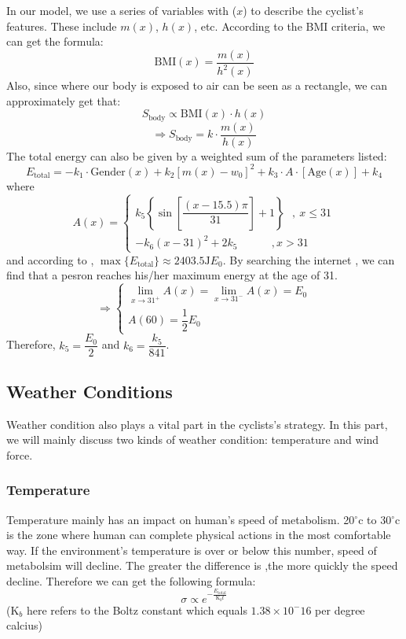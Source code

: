 \documentclass[12pt]{article}
\theoremstyle{definition}
\theoremstyle{remark}
\numberwithin{equation}{section}
\begin{document}
			In our model, we use a series of variables with (\(x\)) to describe the cyclist's features. These include $m( x )$, $ h ( x )$, etc. According to the BMI criteria, we can get the formula:
			$$\mathrm{BMI}( x )=\dfrac{m( x )}{ h ^2( x )}$$
			Also, since where our body is exposed to air can be seen as a rectangle, we can approximately get that:
			\[S_{\mathrm{body}} \propto \mathrm{BMI}(x)\cdot h(x)\]
			\[\Rightarrow S_{\mathrm{body}}=k\cdot \dfrac{m(x)}{h(x)}\]
			The total energy can also be given by a weighted sum of the parameters listed:
			\[E_{\mathrm{total}}=-k_1\cdot\mathrm{Gender}(x)+k_2[m(x)-w_0]^2+k_3\cdot A\cdot [\mathrm{Age}(x)]+k_4\]
			where
			\[A(x)=
				\begin{cases}
					k_5\left\{\sin\left[\dfrac{(x-15.5)\pi}{31 }\right]+1\right\}~~~,~x\leq 31 \\
					-k_6 (x-31)^2+2k_5~~~~~~~~~~~~~~,x>31
				\end{cases}
			\]
			and according to \cite{114514}, \(\max\{E_{\mathrm{total}}\}\approx 2403.5 \mathrm{J} E_{0}\). By searching the internet \cite{energy curve}, we can find that a pesron reaches his/her maximum energy at the age of 31.
			\[
				\Rightarrow
				\begin{cases}
					\lim\limits_{x\rightarrow 31^+} A\left( x \right) =\lim\limits_{x\rightarrow 31^-} A\left( x \right)=E_0 \\
					A(60)=\dfrac 12 E_0
				\end{cases}
			\]
			Therefore, \(k_5 = \dfrac{E_0}{2}\) and \(k_6=\dfrac{k_5}{841}\).
	\subsection{Weather Conditions}
	Weather condition also plays a vital part in the cyclists's strategy. In this part, we will mainly discuss two kinds of weather condition: temperature and wind force.
	\subsubsection{Temperature}
	Temperature mainly has an impact on human's speed of metabolism. 20$^{\circ}\mathrm{c}$ to 30$^{\circ}\mathrm{c}$ is the zone where human can complete physical actions in the most comfortable way. If the environment's temperature is over or below this number, speed of metabolsim will decline. The greater the difference is ,the more quickly the speed decline. Therefore we can get the following formula:
	$$ \sigma\propto e^{-\frac{ E _\mathrm{total}}{\mathrm{K}_ b t}}$$
	($\mathrm{K}_ b $ here refers to the Boltz constant which equals $1.38\times10^-16$ per degree calcius)
\end{document}
